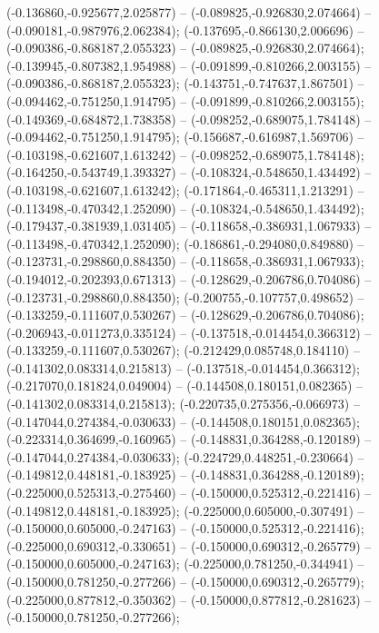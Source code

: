  (-0.136860,-0.925677,2.025877) -- (-0.089825,-0.926830,2.074664) -- (-0.090181,-0.987976,2.062384);
 (-0.137695,-0.866130,2.006696) -- (-0.090386,-0.868187,2.055323) -- (-0.089825,-0.926830,2.074664);
 (-0.139945,-0.807382,1.954988) -- (-0.091899,-0.810266,2.003155) -- (-0.090386,-0.868187,2.055323);
 (-0.143751,-0.747637,1.867501) -- (-0.094462,-0.751250,1.914795) -- (-0.091899,-0.810266,2.003155);
 (-0.149369,-0.684872,1.738358) -- (-0.098252,-0.689075,1.784148) -- (-0.094462,-0.751250,1.914795);
 (-0.156687,-0.616987,1.569706) -- (-0.103198,-0.621607,1.613242) -- (-0.098252,-0.689075,1.784148);
 (-0.164250,-0.543749,1.393327) -- (-0.108324,-0.548650,1.434492) -- (-0.103198,-0.621607,1.613242);
 (-0.171864,-0.465311,1.213291) -- (-0.113498,-0.470342,1.252090) -- (-0.108324,-0.548650,1.434492);
 (-0.179437,-0.381939,1.031405) -- (-0.118658,-0.386931,1.067933) -- (-0.113498,-0.470342,1.252090);
 (-0.186861,-0.294080,0.849880) -- (-0.123731,-0.298860,0.884350) -- (-0.118658,-0.386931,1.067933);
 (-0.194012,-0.202393,0.671313) -- (-0.128629,-0.206786,0.704086) -- (-0.123731,-0.298860,0.884350);
 (-0.200755,-0.107757,0.498652) -- (-0.133259,-0.111607,0.530267) -- (-0.128629,-0.206786,0.704086);
 (-0.206943,-0.011273,0.335124) -- (-0.137518,-0.014454,0.366312) -- (-0.133259,-0.111607,0.530267);
 (-0.212429,0.085748,0.184110) -- (-0.141302,0.083314,0.215813) -- (-0.137518,-0.014454,0.366312);
 (-0.217070,0.181824,0.049004) -- (-0.144508,0.180151,0.082365) -- (-0.141302,0.083314,0.215813);
 (-0.220735,0.275356,-0.066973) -- (-0.147044,0.274384,-0.030633) -- (-0.144508,0.180151,0.082365);
 (-0.223314,0.364699,-0.160965) -- (-0.148831,0.364288,-0.120189) -- (-0.147044,0.274384,-0.030633);
 (-0.224729,0.448251,-0.230664) -- (-0.149812,0.448181,-0.183925) -- (-0.148831,0.364288,-0.120189);
 (-0.225000,0.525313,-0.275460) -- (-0.150000,0.525312,-0.221416) -- (-0.149812,0.448181,-0.183925);
 (-0.225000,0.605000,-0.307491) -- (-0.150000,0.605000,-0.247163) -- (-0.150000,0.525312,-0.221416);
 (-0.225000,0.690312,-0.330651) -- (-0.150000,0.690312,-0.265779) -- (-0.150000,0.605000,-0.247163);
 (-0.225000,0.781250,-0.344941) -- (-0.150000,0.781250,-0.277266) -- (-0.150000,0.690312,-0.265779);
 (-0.225000,0.877812,-0.350362) -- (-0.150000,0.877812,-0.281623) -- (-0.150000,0.781250,-0.277266);
